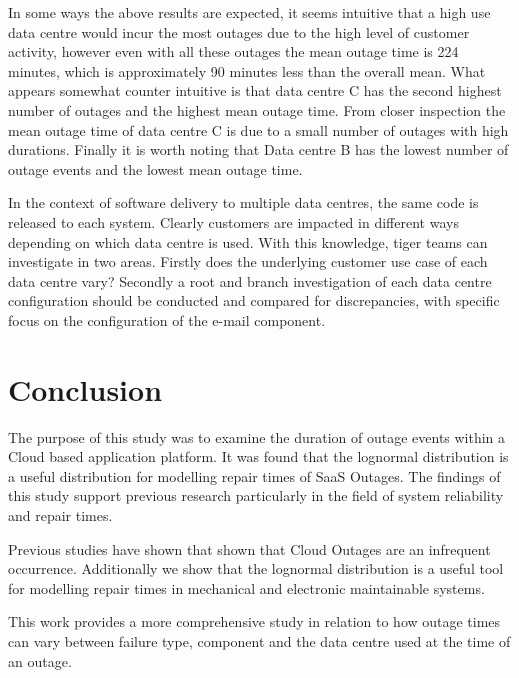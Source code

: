 \documentclass[conference]{IEEEtran}
\begin{document}
In some ways the above results are expected, it seems intuitive that a high use data centre would incur the most outages due to the high level of customer activity, however even with all these outages the mean outage time is 224 minutes, which is approximately 90 minutes less than the overall mean. What appears somewhat counter intuitive is that data centre C has the second highest number of outages and the highest mean outage time. From closer inspection the mean outage time of data centre C is due to a small number of outages with high durations. Finally it is worth noting that Data centre B has the lowest number of outage events and the lowest mean outage time.\par

In the context of software delivery to multiple data centres, the same code is released to each system. Clearly customers are impacted in different ways depending on which data centre is used. With this knowledge, tiger teams can investigate in two areas. Firstly does the underlying customer use case of each data centre vary? Secondly a root and branch investigation of each data centre configuration should be conducted and compared for discrepancies, with specific focus on the configuration of the e-mail component. \par

\section{Conclusion}
The purpose of this study was to examine the duration of outage events within a Cloud based application platform. It was found that the lognormal distribution is a useful distribution for modelling repair times of SaaS Outages. The findings of this study support previous research particularly in the field of system reliability and repair times. \par

Previous studies have shown that shown that Cloud Outages are an infrequent occurrence. Additionally we show that the lognormal distribution is a useful tool for modelling repair times in mechanical and electronic maintainable systems. \par

This work provides a more comprehensive study in relation to how outage times can vary between failure type, component and the data centre used at the time of an outage. \par
\end{document}
